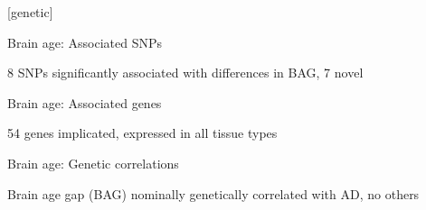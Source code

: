 \documentclass[9pt]{beamer}
\begin{document}
	[genetic]
	\begin{frame}{Brain age: Associated SNPs}
		\centering
		\vfill
		\vfill
        8 SNPs significantly associated with differences in BAG, 7 novel
	\end{frame}

	\begin{frame}{Brain age: Associated genes}
		\centering
		\vfill
		\vfill
        54 genes implicated, expressed in all tissue types
	\end{frame}

	\begin{frame}{Brain age: Genetic correlations}
		\centering
		\vfill
		\vfill
        Brain age gap (BAG) nominally genetically correlated with AD, no others
	\end{frame}
\end{document}
